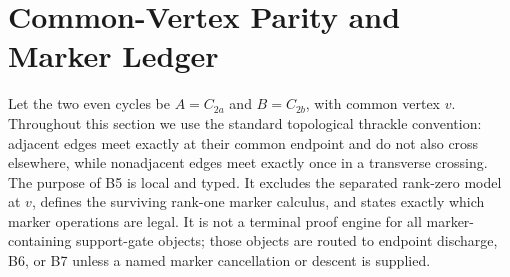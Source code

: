 \documentclass[11pt]{amsart}
\theoremstyle{definition}
\begin{document}
\section{Common-Vertex Parity and Marker Ledger}

Let the two even cycles be \(A=C_{2a}\) and \(B=C_{2b}\), with common vertex \(v\). Throughout this section we use the standard topological thrackle convention: adjacent edges meet exactly at their common endpoint and do not also cross elsewhere, while nonadjacent edges meet exactly once in a transverse crossing. The purpose of B5 is local and typed. It excludes the separated rank-zero model at \(v\), defines the surviving rank-one marker calculus, and states exactly which marker operations are legal. It is not a terminal proof engine for all marker-containing support-gate objects; those objects are routed to endpoint discharge, B6, or B7 unless a named marker cancellation or descent is supplied.
\end{document}
